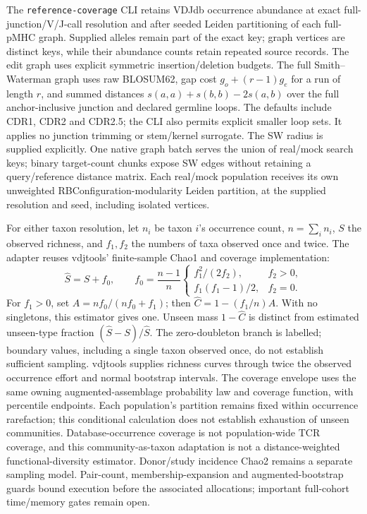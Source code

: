 \documentclass[10pt,a4paper]{article}
\theoremstyle{definition}
\begin{document}
The \texttt{reference-coverage} CLI retains VDJdb occurrence abundance at exact full-junction/V/J-call resolution and after seeded Leiden partitioning of each full-pMHC graph.
Supplied alleles remain part of the exact key; graph vertices are distinct keys, while their abundance counts retain repeated source records.
The edit graph uses explicit symmetric insertion/deletion budgets.
The full Smith--Waterman graph uses raw BLOSUM62, gap cost $g_o+(r-1)g_e$ for a run of length $r$, and summed distances $s(a,a)+s(b,b)-2s(a,b)$ over the full anchor-inclusive junction and declared germline loops.
The defaults include CDR1, CDR2 and CDR2.5; the CLI also permits explicit smaller loop sets.
It applies no junction trimming or stem/kernel surrogate.
The SW radius is supplied explicitly.
One native graph batch serves the union of real/mock search keys; binary target-count chunks expose SW edges without retaining a query/reference distance matrix.
Each real/mock population receives its own unweighted RBConfiguration-modularity Leiden partition, at the supplied resolution and seed, including isolated vertices.

For either taxon resolution, let $n_i$ be taxon $i$'s occurrence count, $n=\sum_i n_i$, $S$ the observed richness, and $f_1,f_2$ the numbers of taxa observed once and twice.
The adapter reuses vdjtools' finite-sample Chao1 and coverage implementation:
\[
 \widehat S=S+f_0,\qquad
 f_0=\frac{n-1}{n}
 \begin{cases}f_1^2/(2f_2),&f_2>0,\\ f_1(f_1-1)/2,&f_2=0.\end{cases}
\]
For $f_1>0$, set $A=nf_0/(nf_0+f_1)$; then $\widehat C=1-(f_1/n)A$.
With no singletons, this estimator gives one.
Unseen mass $1-\widehat C$ is distinct from estimated unseen-type fraction $(\widehat S-S)/\widehat S$.
The zero-doubleton branch is labelled; boundary values, including a single taxon observed once, do not establish sufficient sampling.
vdjtools supplies richness curves through twice the observed occurrence effort and normal bootstrap intervals.
The coverage envelope uses the same owning augmented-assemblage probability law and coverage function, with percentile endpoints.
Each population's partition remains fixed within occurrence rarefaction; this conditional calculation does not establish exhaustion of unseen communities.
Database-occurrence coverage is not population-wide TCR coverage, and this community-as-taxon adaptation is not a distance-weighted functional-diversity estimator.
Donor/study incidence Chao2 remains a separate sampling model.
Pair-count, membership-expansion and augmented-bootstrap guards bound execution before the associated allocations; important full-cohort time/memory gates remain open.
\end{document}
